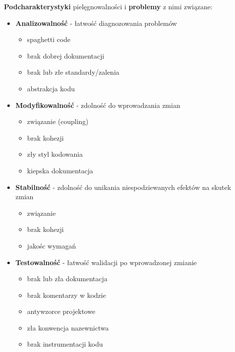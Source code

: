 \documentclass[../main.tex]{subfiles}
\begin{document}
    \textbf{Podcharakterystyki} pielęgnowalności i \textbf{problemy} z nimi związane:
    \begin{itemize}
        \item \textbf{Analizowalność} - łatwość diagnozowania problemów
        \begin{itemize}
            \item spaghetti code
            \item brak dobrej dokumentacji
            \item brak lub złe standardy/zalenia
            \item abstrakcja kodu
        \end{itemize}

        \item \textbf{Modyfikowalność} - zdolność do wprowadzania zmian
        \begin{itemize}
            \item związanie (coupling)
            \item brak kohezji
            \item zły styl kodowania
            \item kiepska dokumentacja
        \end{itemize}

        \item \textbf{Stabilność} - zdolność do unikania niespodziewanych efektów na skutek zmian
        \begin{itemize}
            \item związanie
            \item brak kohezji
            \item jakośc wymagań
        \end{itemize}

        \item \textbf{Testowalność} - łatwość walidacji po wprowadzonej zmianie
        \begin{itemize}
            \item brak lub zła dokumentacja
            \item brak komentarzy w kodzie
            \item antywzorce projektowe
            \item zła konwencja nazewnictwa
            \item brak instrumentacji kodu
        \end{itemize}
    \end{itemize}
\end{document}
